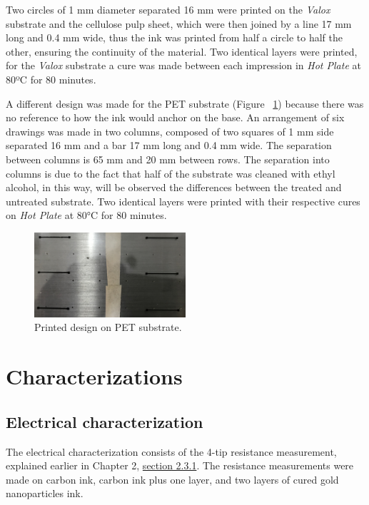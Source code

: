Two circles of 1 mm diameter separated 16 mm were printed on the \textit{Valox} substrate and the cellulose pulp sheet, which were then joined by a line 17 mm long and 0.4 mm wide, thus the ink was printed from half a circle to half the other, ensuring the continuity of the material. Two identical layers were printed, for the \textit{Valox} substrate a cure was made between each impression in \textit{Hot Plate} at 80ºC for 80 minutes.

A different design was made for the PET substrate (Figure ~\ref{fig:Figura_impresion_sobre_PET}) because there was no reference to how the ink would anchor on the base. An arrangement of six drawings was made in two columns, composed of two squares of 1 mm side separated 16 mm and a bar 17 mm long and 0.4 mm wide. The separation between columns is 65 mm and 20 mm between rows. The separation into columns is due to the fact that half of the substrate was cleaned with ethyl alcohol, in this way, will be observed the differences between the treated and untreated substrate. Two identical layers were printed with their respective cures on \textit{Hot Plate} at 80°C for 80 minutes.

\begin{figure}[H]
  \centering
    \includegraphics[width=0.5\textwidth]{Figures/Figura_impresion_sobre_PET}
  \caption{Printed design on PET substrate.}
  \label{fig:Figura_impresion_sobre_PET}
\end{figure}

\section{Characterizations}
\subsection{Electrical characterization}
The electrical characterization consists of the 4-tip resistance measurement, explained earlier in Chapter 2, \hyperref[subsec:carac_elec]{section 2.3.1}. The resistance measurements were made on carbon ink, carbon ink plus one layer, and two layers of cured gold nanoparticles ink.


